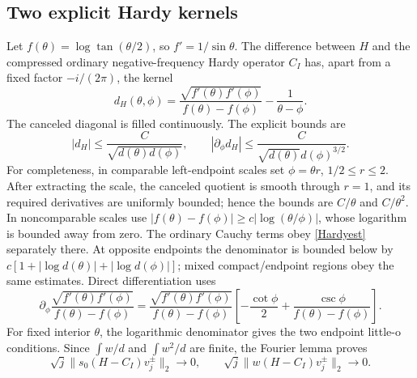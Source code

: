 \subsection{Two explicit Hardy kernels}
Let $f(\theta)=\log\tan(\theta/2)$, so $f'=1/\sin\theta$.
The difference between $H$ and the compressed ordinary
negative-frequency Hardy operator $C_I$ has, apart from a fixed
factor $-i/(2\pi)$, the kernel
\[
 d_H(\theta,\phi)=
 \frac{\sqrt{f'(\theta)f'(\phi)}}{f(\theta)-f(\phi)}
                         -\frac1{\theta-\phi}.
\]
The canceled diagonal is filled continuously. The explicit bounds are
\begin{equation}\label{Hardyest}
 |d_H|\le\frac C{\sqrt{d(\theta)d(\phi)}},\qquad
 |\partial_\phi d_H|\le\frac C{\sqrt{d(\theta)}d(\phi)^{3/2}}.
\end{equation}
For completeness, in comparable left-endpoint scales set $\phi=\theta r$,
$1/2\le r\le2$. After extracting the scale, the canceled quotient
is smooth through $r=1$, and its required derivatives are uniformly
bounded; hence the bounds are $C/\theta$ and $C/\theta^2$.
In noncomparable scales use
$|f(\theta)-f(\phi)|\ge c|\log(\theta/\phi)|$, whose logarithm
is bounded away from zero. The ordinary Cauchy terms obey
\eqref{Hardyest} separately there. At opposite endpoints the denominator
is bounded below by
$c[1+|\log d(\theta)|+|\log d(\phi)|]$; mixed compact/endpoint
regions obey the same estimates. Direct differentiation uses
\[
 \partial_\phi\frac{\sqrt{f'(\theta)f'(\phi)}}{f(\theta)-f(\phi)}
 =\frac{\sqrt{f'(\theta)f'(\phi)}}{f(\theta)-f(\phi)}
       \left[-\frac{\cot\phi}{2}
                    +\frac{\csc\phi}{f(\theta)-f(\phi)}\right].
\]
For fixed interior $\theta$, the logarithmic denominator gives the
two endpoint little-o conditions. Since $\int w/d$ and
$\int w^2/d$ are finite, the Fourier lemma proves
\begin{equation}\label{Hardywaves}
 \sqrt j\|s_0(H-C_I)v_j^\pm\|_2\to0,
 \qquad \sqrt j\|w(H-C_I)v_j^\pm\|_2\to0.
\end{equation}

